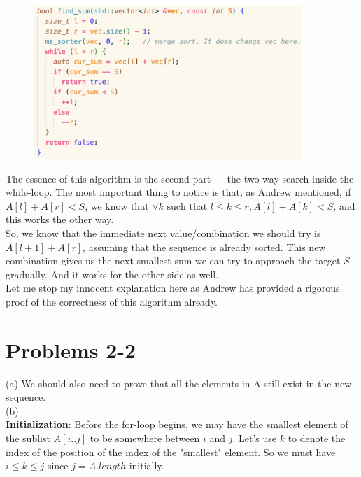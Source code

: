 \documentclass[14pt]{article}
\begin{document}
\begin{figure}[h]
    \centering
    \includegraphics[width=4in]{img/find_sum.png}
\end{figure}

The essence of this algorithm is the second part --- the two-way search inside the while-loop. The most important thing to notice is that, as Andrew mentioned, if
$A[l] + A[r] < S$, we know that 
$\forall k \text{ such that } l \leq k \leq r, A[l] + A[k] < S$, and this works the other way. \\

 So, we know that the immediate next value/combination we should try is $A[l + 1] + A[r]$, assuming that the sequence is already sorted. This new combination gives us the next smallest sum we can try to approach the target $S$ gradually. And it works for the other side as well. \\
 
 Let me stop my innocent explanation here as Andrew has provided a rigorous proof of the correctness of this algorithm already. 



\pagebreak
\section*{Problems 2-2}
(a) We should also need to prove that all the elements in A still exist in the new sequence. \\

\noindent (b)\\

\textbf{Initialization}: 
Before the for-loop begins, we may have the smallest element of the sublist $A[i..j]$ to be somewhere between $i$ and $j$. Let's use $k$ to denote the index of the position of the index of the "smallest" element. So we must have $i \leq k \leq j$ since $j = A.length$ initially.\\
\end{document}
